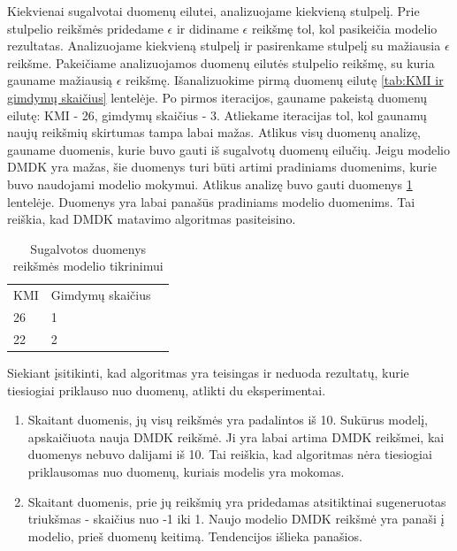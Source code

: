 \documentclass{VUMIFInfBakalaurinis}
\begin{document}
\par Kiekvienai sugalvotai duomenų eilutei, analizuojame kiekvieną stulpelį. Prie stulpelio reikšmės pridedame $\epsilon$ ir didiname $\epsilon$ reikšmę tol, kol pasikeičia modelio rezultatas. Analizuojame kiekvieną stulpelį ir pasirenkame stulpelį su mažiausia $\epsilon$ reikšme. Pakeičiame analizuojamos duomenų eilutės stulpelio reikšmę, su kuria gauname mažiausią $\epsilon$ reikšmę. Išanalizuokime pirmą duomenų eilutę \ref{tab:KMI ir gimdymų skaičius} lentelėje. Po pirmos iteracijos, gauname pakeistą duomenų eilutę: KMI - 26, gimdymų skaičius - 3. Atliekame iteracijas tol, kol gaunamų naujų reikšmių skirtumas tampa labai mažas. Atlikus visų duomenų analizę, gauname duomenis, kurie buvo gauti iš sugalvotų duomenų eilučių. Jeigu modelio DMDK yra mažas, šie duomenys turi būti artimi pradiniams duomenims, kurie buvo naudojami modelio mokymui. Atlikus analizę buvo gauti duomenys \ref{tab:Duomenu tikrinimas} lentelėje. Duomenys yra labai panašūs pradiniams modelio duomenims. Tai reiškia, kad DMDK matavimo algoritmas pasiteisino.

\begin{table}[h]
\centering
\begin{tabular}{|l|l|l|}
\cline{1-2}
KMI & Gimdymų skaičius \\\cline{1-2}
26      & 1 \\\cline{1-2}
22       & 2 \\\cline{1-2}
\end{tabular}
\caption{Sugalvotos duomenys reikšmės modelio tikrinimui}
\label{tab:Duomenu tikrinimas}
\end{table}

\par Siekiant įsitikinti, kad algoritmas yra teisingas ir neduoda rezultatų, kurie tiesiogiai priklauso nuo duomenų, atlikti du eksperimentai.

\begin{enumerate}
    \item Skaitant duomenis, jų visų reikšmės yra padalintos iš 10. Sukūrus modelį, apskaičiuota nauja DMDK reikšmė. Ji yra labai artima DMDK reikšmei, kai duomenys nebuvo dalijami iš 10. Tai reiškia, kad algoritmas nėra tiesiogiai priklausomas nuo duomenų, kuriais modelis yra mokomas.
    \item Skaitant duomenis, prie jų reikšmių yra pridedamas atsitiktinai sugeneruotas triukšmas - skaičius nuo -1 iki 1. Naujo modelio DMDK reikšmė yra panaši į modelio, prieš duomenų keitimą. Tendencijos išlieka panašios.
\end{enumerate}
\end{document}
